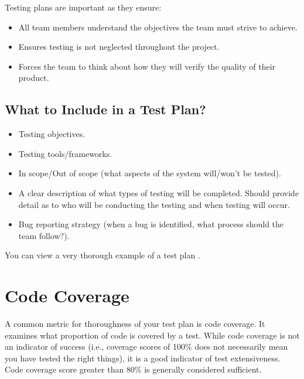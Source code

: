 \documentclass[letterpaper,10pt,english]{jupyterBook}
\begin{document}
\sphinxAtStartPar
Testing plans are important as they ensure:
\begin{itemize}
\item {} 
\sphinxAtStartPar
All team members understand the objectives the team must strive to
achieve.

\item {} 
\sphinxAtStartPar
Ensures testing is not neglected throughout the project.

\item {} 
\sphinxAtStartPar
Forces the team to think about how they will verify the quality of
their product.

\end{itemize}


\subsection{What to Include in a Test Plan?}
\label{\detokenize{chapter_13/testing:what-to-include-in-a-test-plan}}\begin{itemize}
\item {} 
\sphinxAtStartPar
Testing objectives.

\item {} 
\sphinxAtStartPar
Testing tools/frameworks.

\item {} 
\sphinxAtStartPar
In scope/Out of scope (what aspects of the system will/won’t be
tested).

\item {} 
\sphinxAtStartPar
A clear description of what types of testing will be completed.
Should provide detail as to who will be conducting the testing and
when testing will occur.

\item {} 
\sphinxAtStartPar
Bug reporting strategy (when a bug is identified, what process
should the team follow?).

\end{itemize}

\sphinxAtStartPar
You can view a very thorough example of a test plan .


\section{Code Coverage}
\label{\detokenize{chapter_13/testing:code-coverage}}
\sphinxAtStartPar
A common metric for thoroughness of your test plan is code coverage. It
examines what proportion of code is covered by a test. While code
coverage is not an indicator of success (i.e., coverage scores of 100\%
does not necessarily mean you have tested the right things), it is a
good indicator of test extensiveness. Code coverage score greater than
80\% is generally considered sufficient.
\end{document}
